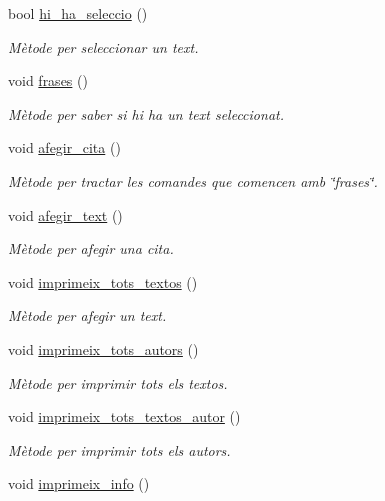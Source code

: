 \begin{DoxyCompactItemize}
bool \hyperlink{class_cjt__autors_a60adf6ed96d0c69487bd7e9de6aa7e1d}{hi\+\_\+ha\+\_\+seleccio} ()
\begin{DoxyCompactList}\small\item\em Mètode per seleccionar un text. \end{DoxyCompactList}\item 
void \hyperlink{class_cjt__autors_a9449545eb6877cb96e54d121faff04d1}{frases} ()
\begin{DoxyCompactList}\small\item\em Mètode per saber si hi ha un text seleccionat. \end{DoxyCompactList}\item 
void \hyperlink{class_cjt__autors_a2c0fec1160c25fd7d458ff0b62f250ff}{afegir\+\_\+cita} ()
\begin{DoxyCompactList}\small\item\em Mètode per tractar les comandes que comencen amb \char`\"{}frases\char`\"{}. \end{DoxyCompactList}\item 
void \hyperlink{class_cjt__autors_aec38f4dac32347c8b320bbf4aa204b5b}{afegir\+\_\+text} ()
\begin{DoxyCompactList}\small\item\em Mètode per afegir una cita. \end{DoxyCompactList}\item 
void \hyperlink{class_cjt__autors_a408618804b43301a240b75a9592c77d0}{imprimeix\+\_\+tots\+\_\+textos} ()
\begin{DoxyCompactList}\small\item\em Mètode per afegir un text. \end{DoxyCompactList}\item 
void \hyperlink{class_cjt__autors_a29ee6a7cf456ab121e154b68b0e5ec4c}{imprimeix\+\_\+tots\+\_\+autors} ()
\begin{DoxyCompactList}\small\item\em Mètode per imprimir tots els textos. \end{DoxyCompactList}\item 
void \hyperlink{class_cjt__autors_ae89d39d6a6ba754a3f2442de2b7a56db}{imprimeix\+\_\+tots\+\_\+textos\+\_\+autor} ()
\begin{DoxyCompactList}\small\item\em Mètode per imprimir tots els autors. \end{DoxyCompactList}\item 
void \hyperlink{class_cjt__autors_ac98f1a4d2ec3a115ac089ca33c7a6f9c}{imprimeix\+\_\+info} ()

\end{DoxyCompactItemize}

